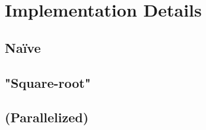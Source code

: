 \section{Implementation Details}


\subsection{Naïve}

\subsection{"Square-root"}

\subsection{(Parallelized)}